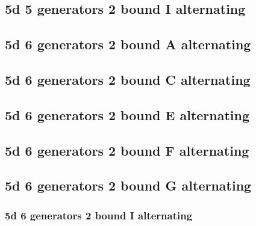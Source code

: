 \documentclass{TC}
\begin{document}
{
\singlespacing
\newpage
\subsection{5d 5 generators 2 bound I alternating}

\newpage

\subsection{5d 6 generators 2 bound A alternating}

\newpage

\subsection{5d 6 generators 2 bound C alternating}

\newpage

\subsection{5d 6 generators 2 bound E alternating}

\newpage

\subsection{5d 6 generators 2 bound F alternating}

\newpage

\subsection{5d 6 generators 2 bound G alternating}

\newpage

\subsubsection{5d 6 generators 2 bound I alternating}

\newpage
}
\end{document}
